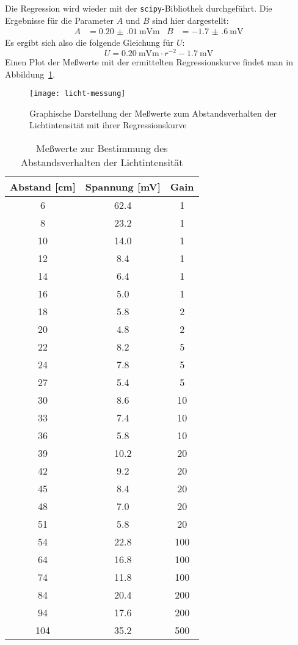 Die Regression wird wieder mit der \texttt{scipy}-Bibliothek
durchgeführt. Die Ergebnisse für die Parameter $A$ und $B$ sind hier
dargestellt:
%
\begin{align}
  A &= \SI{0.20(01)}{\milli\volt\metre} & 
  B &= \SI{-1.7(6)}{\milli\volt}
\end{align}
%
Es ergibt sich also die folgende Gleichung für $U$:
%
\begin{equation}
  U = \SI{0.20}{\milli\volt\metre} \cdot r^{-2} -
  \SI{1.7}{\milli\volt}
\end{equation}
%
Einen Plot der Meßwerte mit der ermittelten Regressionskurve findet man
in Abbildung~\ref{fig:licht-messung}.

\begin{figure}
  \centering
  \texttt{[image: licht-messung]}
  \caption{Graphische Darstellung der Meßwerte zum Abstandsverhalten der
    Lichtintensität mit ihrer Regressionskurve}
  \label{fig:licht-messung}
\end{figure}

\begin{table}
  \centering
  \begin{tabular}{SSS}
    \toprule
    {Abstand [\si{\centi\metre}]} &
    {Spannung [\si{\milli\volt}]} &
    {Gain} \\
     & 62.4 &   1 \\
    8 & 23.2 &   1 \\
    10 & 14.0 &   1 \\
    12 &  8.4 &   1 \\
    14 &  6.4 &   1 \\
    16 &  5.0 &   1 \\
    18 &  5.8 &   2 \\
    20 &  4.8 &   2 \\
    22 &  8.2 &   5 \\
    24 &  7.8 &   5 \\
    27 &  5.4 &   5 \\
    30 &  8.6 &  10 \\
    33 &  7.4 &  10 \\
    36 &  5.8 &  10 \\
    39 & 10.2 &  20 \\
    42 &  9.2 &  20 \\
    45 &  8.4 &  20 \\
    48 &  7.0 &  20 \\
    51 &  5.8 &  20 \\
    54 & 22.8 & 100 \\
    64 & 16.8 & 100 \\
    74 & 11.8 & 100 \\
    84 & 20.4 & 200 \\
    94 & 17.6 & 200 \\
    104 & 35.2 & 500 \\
    \bottomrule
  \end{tabular}
  \caption{Meßwerte zur Bestimmung des Abstandsverhalten 
    der Lichtintensität}
  \label{tab:licht-messung}
\end{table}
